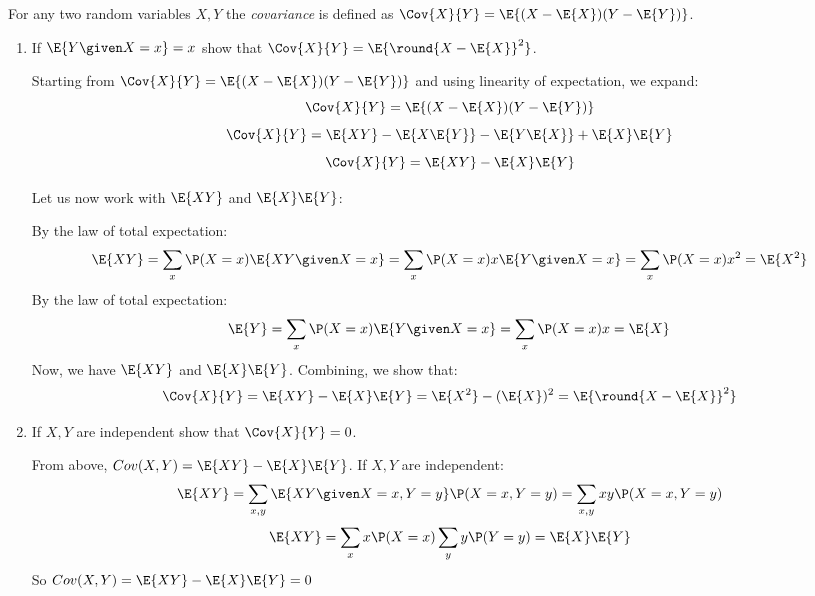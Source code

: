 \documentclass{article}
\begin{document}
\noindent\makebox[\linewidth]{\rule{\textwidth}{0.4pt}}
\begin{aprob}
    For any two random variables $X,Y$ the \emph{covariance} is defined as $\Cov{X}{Y}=\E{(X-\E{X})(Y-\E{Y})}$. 
    \begin{enumerate}
        \item {} If $\E{Y\given X=x} = x$ show that $\Cov{X}{Y} = \E{\round{X-\E{X}}^2}$.  
        
        Starting from $\Cov{X}{Y}=\E{(X-\E{X})(Y-\E{Y})}$ and using linearity of expectation, we expand:
        \begin{equation} 
        \Cov{X}{Y}=\E{(X-\E{X})(Y-\E{Y})}
        \end{equation}
        \begin{equation} 
        \Cov{X}{Y}=\E{XY}-\E{X\E{Y}}-\E{Y\E{X}}+\E{X}\E{Y}
        \end{equation}
        \begin{equation} 
        \Cov{X}{Y}=\E{XY}-\E{X}\E{Y}
        \end{equation}
        
        Let us now work with $\E{XY}$ and $\E{X}\E{Y}$:
        
        By the law of total expectation: 
        \begin{equation} 
        \E{XY} = \sum_{x} \P(X=x)\E{XY\given X=x} = \sum_{x} \P(X=x)x\E{Y\given X=x} = \sum_{x}\P(X=x)x^2 = \E{X^2}
        \end{equation}
        By the law of total expectation: 
        \begin{equation} 
        \E{Y} = \sum_{x} \P(X=x)\E{Y\given X=x} = \sum_{x} \P(X=x)x = \E{X}
        \end{equation}
        Now, we have $\E{XY}$ and $\E{X}\E{Y}$. Combining, we show that: 
        \begin{equation}
        \Cov{X}{Y} = \E{XY} - \E{X}\E{Y} = \E{X^2} - (\E{X})^2 = \E{\round{X-\E{X}}^2}
        \end{equation}
        
        \item {} If $X, Y$ are independent show that $\Cov{X}{Y}=0$.
        
        From above, $Cov(X,Y) = \E{XY}-\E{X}\E{Y}$. If $X, Y$ are independent:
        \begin{equation}
        \E{XY} = \sum_{x,y} \E{XY\given X=x, Y=y}\P(X=x, Y=y) = \sum_{x,y} xy \P(X=x, Y=y)
        \end{equation}
        \begin{equation}
        \E{XY} = \sum_{x}x\P(X=x)\sum_{y}y\P(Y=y) = \E{X}\E{Y}
        \end{equation}
        So $Cov(X,Y) = \E{XY}-\E{X}\E{Y} = 0$
        
        
    \end{enumerate}
\end{aprob}
\end{document}
